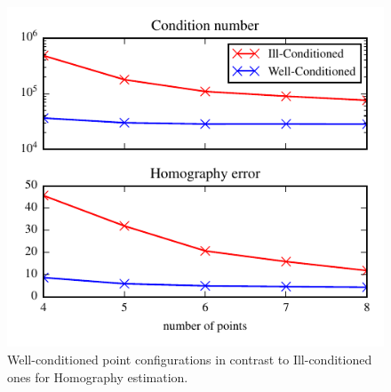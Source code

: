 \documentclass[letterpaper, 10 pt, conference]{ieeeconf}  %
\begin{document}
\begin{figure}[t]
  \begin{center}
    \includegraphics[width=\columnwidth]{img/point_config_comp_homo.pdf}
    \caption{\label{fig:homography_results} Well-conditioned point configurations in contrast to Ill-conditioned ones for Homography estimation.}
  \end{center}
\end{figure}
\end{document}

